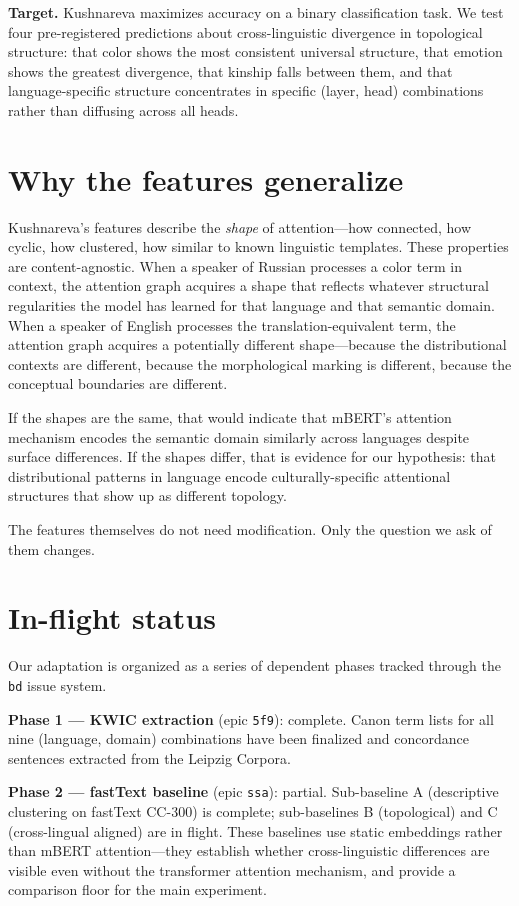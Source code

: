 \textbf{Target.} Kushnareva maximizes accuracy on a binary classification task. We test four pre-registered predictions about cross-linguistic divergence in topological structure: that color shows the most consistent universal structure, that emotion shows the greatest divergence, that kinship falls between them, and that language-specific structure concentrates in specific (layer, head) combinations rather than diffusing across all heads.

\section{Why the features generalize}

Kushnareva's features describe the \emph{shape} of attention---how connected, how cyclic, how clustered, how similar to known linguistic templates. These properties are content-agnostic. When a speaker of Russian processes a color term in context, the attention graph acquires a shape that reflects whatever structural regularities the model has learned for that language and that semantic domain. When a speaker of English processes the translation-equivalent term, the attention graph acquires a potentially different shape---because the distributional contexts are different, because the morphological marking is different, because the conceptual boundaries are different.

If the shapes are the same, that would indicate that mBERT's attention mechanism encodes the semantic domain similarly across languages despite surface differences. If the shapes differ, that is evidence for our hypothesis: that distributional patterns in language encode culturally-specific attentional structures that show up as different topology.

The features themselves do not need modification. Only the question we ask of them changes.

\section{In-flight status}

Our adaptation is organized as a series of dependent phases tracked through the \texttt{bd} issue system.

\textbf{Phase 1 --- KWIC extraction} (epic \texttt{5f9}): complete. Canon term lists for all nine (language, domain) combinations have been finalized and concordance sentences extracted from the Leipzig Corpora.

\textbf{Phase 2 --- fastText baseline} (epic \texttt{ssa}): partial. Sub-baseline A (descriptive clustering on fastText CC-300) is complete; sub-baselines B (topological) and C (cross-lingual aligned) are in flight. These baselines use static embeddings rather than mBERT attention---they establish whether cross-linguistic differences are visible even without the transformer attention mechanism, and provide a comparison floor for the main experiment.

